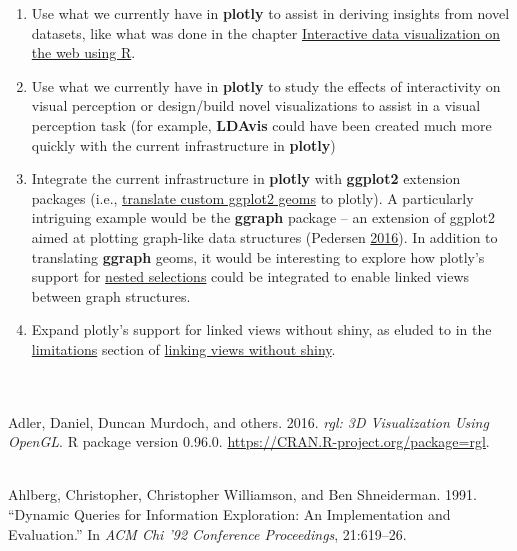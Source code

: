 \documentclass[12pt,]{isuthesis}
\begin{document}
\begin{enumerate}
\def\labelenumi{\arabic{enumi}.}
\item
  Use what we currently have in \textbf{plotly} to assist in deriving
  insights from novel datasets, like what was done in the chapter
  \protect\hyperlink{interactive-data-visualization-on-the-web-using-R}{Interactive
  data visualization on the web using R}.
\item
  Use what we currently have in \textbf{plotly} to study the effects of
  interactivity on visual perception or design/build novel
  visualizations to assist in a visual perception task (for example,
  \textbf{LDAvis} could have been created much more quickly with the
  current infrastructure in \textbf{plotly})
\item
  Integrate the current infrastructure in \textbf{plotly} with
  \textbf{ggplot2} extension packages (i.e.,
  \protect\hyperlink{translating-custom-ggplot2-geoms}{translate custom
  ggplot2 geoms} to plotly). A particularly intriguing example would be
  the \textbf{ggraph} package -- an extension of ggplot2 aimed at
  plotting graph-like data structures (Pedersen
  \protect\hyperlink{ref-ggraph}{2016}). In addition to translating
  \textbf{ggraph} geoms, it would be interesting to explore how plotly's
  support for \protect\hyperlink{nested-selections}{nested selections}
  could be integrated to enable linked views between graph structures.
\item
  Expand plotly's support for linked views without shiny, as eluded to
  in the \protect\hyperlink{limitations}{limitations} section of
  \protect\hyperlink{linking-views-without-shiny}{linking views without
  shiny}.
\end{enumerate}

\newcommand{\tex}[1]{#1}

\tex{
  \setlength{\parindent}{15pt}
  \let\oldhypertarget\hypertarget
  \renewcommand{\hypertarget}[2]{\oldhypertarget{#1}{#2}~\\[0in]\indent}
  \specialchapt{BIBLIOGRAPHY}
}

\hypertarget{refs}{}
\hypertarget{ref-rgl}{}
Adler, Daniel, Duncan Murdoch, and others. 2016. \emph{rgl: 3D
Visualization Using OpenGL}. R package version 0.96.0.
\url{https://CRAN.R-project.org/package=rgl}.

\hypertarget{ref-Ahlberg:1991}{}
Ahlberg, Christopher, Christopher Williamson, and Ben Shneiderman. 1991.
``Dynamic Queries for Information Exploration: An Implementation and
Evaluation.'' In \emph{ACM Chi '92 Conference Proceedings}, 21:619--26.
\end{document}
